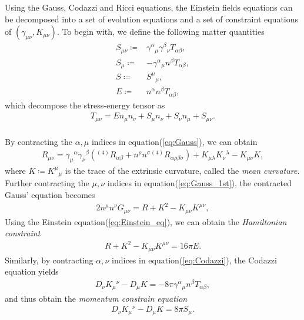 Using the Gauss, Codazzi and Ricci equations,
the Einstein fields equations can be decomposed into a set of evolution equations and a set of constraint equations of $(\gamma_{\mu\nu}, K_{\mu\nu})$.
To begin with, we define the following matter quantities
\begin{align}
    S_{\mu\nu} \coloneqq& \gamma^{\alpha}{}_{\mu} \gamma^{\beta}{}_{\nu} T_{\alpha\beta}, \\
    S_\mu \coloneqq& - \gamma^{\alpha}{}_{\mu} n^{\beta} T_{\alpha\beta}, \\
    S \coloneqq& S^\mu{}_\mu, \\
    E \coloneqq& n^\alpha n^\beta T_{\alpha\beta},
\end{align}
which decompose the stress-energy tensor as
\begin{align}\label{eq:T_decompose}
    T_{\mu\nu} = E n_\mu n_\nu + S_\mu n_\nu + S_\nu n_\mu + S_{\mu\nu}.
\end{align}\\
By contracting the $\alpha,\mu$ indices in equation(\ref{eq:Gauss}), we can obtain
\begin{align}\label{eq:Gauss_1st}
    R_{\mu\nu} = \gamma_{\mu}{}^{\alpha}\gamma_{\nu}{}^{\beta} \left( {}^{(4)} R_{\alpha\beta} + n^\rho n^\sigma {}^{(4)}R_{\alpha\rho\beta\sigma} \right) + K_{\mu\lambda} K_\nu{}^{\lambda} - K_{\mu\nu} K,
\end{align}
where $K\coloneqq K^\mu{}_{\mu}$ is the trace of the extrinsic curvature,
called the \textit{mean curvature}.
Further contracting the $\mu, \nu$ indices in equation(\ref{eq:Gauss_1st}), the contracted Gauss' equation becomes
\begin{align}\label{eq:Gaussr_2nd}
    2 n^\mu n^\nu G_{\mu\nu} = R + K^2 - K_{\mu\nu} K^{\mu\nu},
\end{align}
Using the Einstein equation(\ref{eq:Einstein_eq}), we can obtain the \textit{Hamiltonian constraint}
\begin{align}
    R + K^2 - K_{\mu\nu} K^{\mu\nu} = 16\pi E.
\end{align}
Similarly, by contracting $\alpha, \nu$ indices in equation(\ref{eq:Codazzi}), the Codazzi equation yields
\begin{align}
    D_{\nu} K_{\mu}{}^{\nu} - D_\mu K = - 8\pi \gamma^{\alpha}{}_{\mu} n^{\beta} T_{\alpha\beta},
\end{align}
and thus obtain the \textit{momentum constrain equation}
\begin{align}
    D_{\nu} K_{\mu}{}^{\nu} - D_\mu K = 8 \pi S_{\mu}.
\end{align}\\
